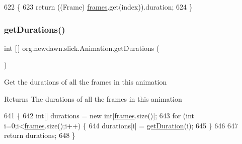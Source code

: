 \begin{DoxyCode}
622                                       \{
623         \textcolor{keywordflow}{return} ((Frame) \mbox{\hyperlink{classorg_1_1newdawn_1_1slick_1_1_animation_a39f0c6a16e479985b22f7dd3bb781bf7}{frames}}.get(index)).duration;
624     \}
\end{DoxyCode}
\mbox{\label{classorg_1_1newdawn_1_1slick_1_1_animation_a38bee3c1d6b9eca8d3306ac3fedd9ceb}} 
\subsubsection{\texorpdfstring{get\+Durations()}{getDurations()}}
{\footnotesize\ttfamily int \mbox{[}$\,$\mbox{]} org.\+newdawn.\+slick.\+Animation.\+get\+Durations (\begin{DoxyParamCaption}{ }\end{DoxyParamCaption})\hspace{0.3cm}{\ttfamily [inline]}}

Get the durations of all the frames in this animation

\begin{DoxyReturn}{Returns}
The durations of all the frames in this animation 
\end{DoxyReturn}

\begin{DoxyCode}
641                                 \{
642         \textcolor{keywordtype}{int}[] durations = \textcolor{keyword}{new} \textcolor{keywordtype}{int}[\mbox{\hyperlink{classorg_1_1newdawn_1_1slick_1_1_animation_a39f0c6a16e479985b22f7dd3bb781bf7}{frames}}.size()];
643         \textcolor{keywordflow}{for} (\textcolor{keywordtype}{int} i=0;i<\mbox{\hyperlink{classorg_1_1newdawn_1_1slick_1_1_animation_a39f0c6a16e479985b22f7dd3bb781bf7}{frames}}.size();i++) \{
644             durations[i] = \mbox{\hyperlink{classorg_1_1newdawn_1_1slick_1_1_animation_a5e51e58072497b8180288c240fc7a763}{getDuration}}(i);
645         \}
646         
647         \textcolor{keywordflow}{return} durations;
648     \}
\end{DoxyCode}
\mbox{\label{classorg_1_1newdawn_1_1slick_1_1_animation_ae4a4f4a202ca6e87a99856b31d0e2139}} 
